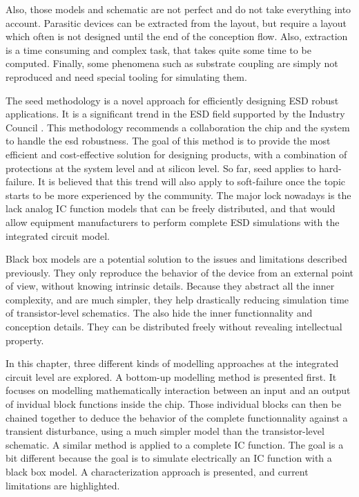 Also, those models and schematic are not perfect and do not take everything into account.
Parasitic devices can be extracted from the layout, but require a layout which often is not designed until the end of the conception flow.
Also, extraction is a time consuming and complex task, that takes quite some time to be computed.
Finally, some phenomena such as substrate coupling are simply not reproduced and need special tooling for simulating them.

The \gls{seed} methodology is a novel approach for efficiently designing ESD robust applications.
It is a significant trend in the ESD field supported by the Industry Council \cite{seed}.
This methodology recommends a collaboration the chip and the system to handle the \gls{esd} robustness.
The goal of this method is to provide the most efficient and cost-effective solution for designing products, with a combination of protections at the system level and at silicon level.
So far, \gls{seed} applies to hard-failure.
It is believed that this trend will also apply to soft-failure once the topic starts to be more experienced by the community.
The major lock nowadays is the lack analog IC function models that can be freely distributed, and that would allow equipment manufacturers to perform complete ESD simulations with the integrated circuit model.

Black box models are a potential solution to the issues and limitations described previously.
They only reproduce the behavior of the device from an external point of view, without knowing intrinsic details.
Because they abstract all the inner complexity, and are much simpler, they help drastically reducing simulation time of transistor-level schematics.
The also hide the inner functionnality and conception details.
They can be distributed freely without revealing intellectual property.

In this chapter, three different kinds of modelling approaches at the integrated circuit level are explored.
A bottom-up modelling method is presented first.
It focuses on modelling mathematically interaction between an input and an output of invidual block functions inside the chip.
Those individual blocks can then be chained together to deduce the behavior of the complete functionnality against a transient disturbance, using a much simpler model than the transistor-level schematic.
A similar method is applied to a complete IC function.
The goal is a bit different because the goal is to simulate electrically an IC function with a black box model.
A characterization approach is presented, and current limitations are highlighted.

